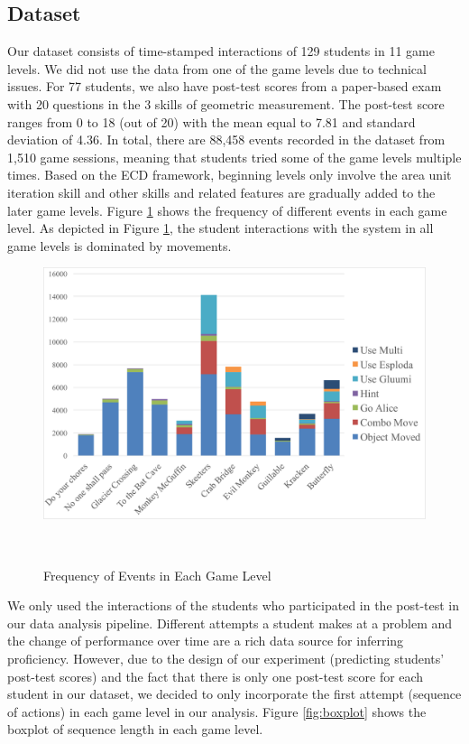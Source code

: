\documentclass{sigchi}
\begin{document}
	\subsection{Dataset} 
	Our dataset consists of time-stamped interactions of 129 students in 11 game levels.
	We did not use the data from one of the game levels due to technical issues.
	For 77 students, we also have post-test scores from a paper-based exam with 20 questions in the 3 skills of geometric measurement.
	The post-test score ranges from 0 to 18 (out of 20) with the mean equal to 7.81 and standard deviation of 4.36. 
	In total, there are 88,458 events recorded in the dataset from 1,510 game sessions, meaning that students tried some of the game levels  multiple times.
	Based on the ECD framework, beginning levels only involve the area unit iteration skill and other skills and related features are gradually added to the later game levels.
	Figure \ref{fig:frequency} shows the frequency of different events in each game level. As depicted in Figure \ref{fig:frequency}, the student interactions with the system in all game levels is dominated by movements.
	
	\begin{figure}
		\centering
		\includegraphics[width=0.9\columnwidth]{figures/frequency.pdf}
		\caption{Frequency of Events in Each Game Level}~\label{fig:frequency}
	\end{figure}
	
	
	We only used the interactions of the students who participated in the post-test in our data analysis pipeline.
	Different attempts a student makes at a problem and the change of performance over time are a rich data source for inferring proficiency.
	However, due to the design of our experiment (predicting students' post-test scores) and the fact that there is only one post-test score for each student in our dataset, we decided to  only incorporate the first attempt (sequence of actions) in each game level in our analysis. Figure \ref{fig:boxplot} shows the boxplot of sequence length in each game level. 
\end{document}
